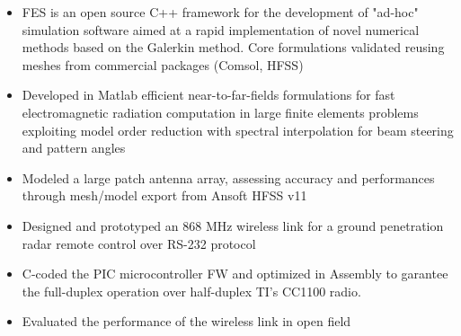 \documentclass[9pt,a4paper,ragged2e,withhyper]{altacv} %
\begin{document}
\begin{paracol}{2}
\begin{itemize}
\item FES is an open source C++ framework for the development of "ad-hoc" simulation
software aimed at a rapid implementation of novel numerical methods based on the
Galerkin method. Core formulations validated reusing meshes from commercial
packages (Comsol, HFSS)
\end{itemize}
\divider

\begin{itemize}
\item Developed in Matlab efficient near-to-far-fields formulations for fast electromagnetic radiation computation in large finite elements problems exploiting model order
reduction with spectral interpolation for beam steering and pattern angles
\item Modeled a large patch antenna array, assessing accuracy and performances through mesh/model export from Ansoft HFSS v11
\end{itemize}
\divider


\begin{itemize}
\item Designed and prototyped an 868 MHz wireless link for a ground penetration radar
remote control over RS-232 protocol
\item C-coded the PIC microcontroller FW and
optimized in Assembly to garantee the full-duplex operation over half-duplex TI’s
CC1100 radio. 
\item Evaluated the performance of the wireless link in open field
\end{itemize}





\end{paracol}
\end{document}
